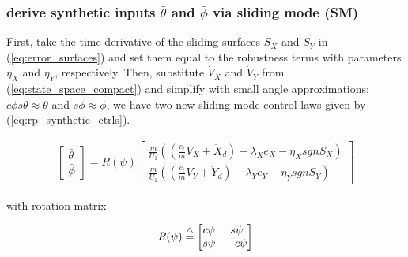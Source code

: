 \documentclass[journal,11pt,onecolumn,draftclsnofoot,]{IEEEtran}
\begin{document}
\subsubsection{derive synthetic inputs $\bar{\theta}$ and $\bar{\phi}$ via sliding mode (SM)}
First, take the time derivative of the sliding surfaces $S_X$ and $S_Y$ in (\ref{eq:error_surfaces}) and set them equal to the robustness terms with parameters $\eta_X$ and $\eta_Y$, respectively.
Then, substitute $\dot{V}_X$ and $\dot{V}_Y$ from (\ref{eq:state_space_compact}) and simplify with small angle approximations: $c\phi s\theta \approx \theta$ and $s\phi \approx \phi$, we have two new sliding mode control laws given by (\ref{eq:rp_synthetic_ctrls}).

\begin{equation}
\label{eq:rp_synthetic_ctrls}
\begin{split}
\begin{bmatrix}
\bar{\theta}\\ 
\bar{\phi}
\end{bmatrix}
= R(\psi) 
\begin{bmatrix}
\frac{m}{U_1} \left( \left( \frac{c_t}{m}V_X +\ddot{X}_d \right) - \lambda_X \dot{e}_X - \eta_X sgn S_X \right)\\
\frac{m}{U_1} \left( \left( \frac{c_t}{m}V_Y + \ddot{Y}_d \right) - \lambda_Y \dot{e}_Y - \eta_Y sgn S_Y \right)
\end{bmatrix}
\end{split}
\end{equation}

with rotation matrix

\begin{equation*}
\label{eq:R_yaw}
\begin{split}
R(\psi)  \buildrel\triangle\over =
\begin{bmatrix}
c\psi & s\psi \\ 
s\psi & -c\psi
\end{bmatrix}
\end{split}
\end{equation*}
\end{document}
